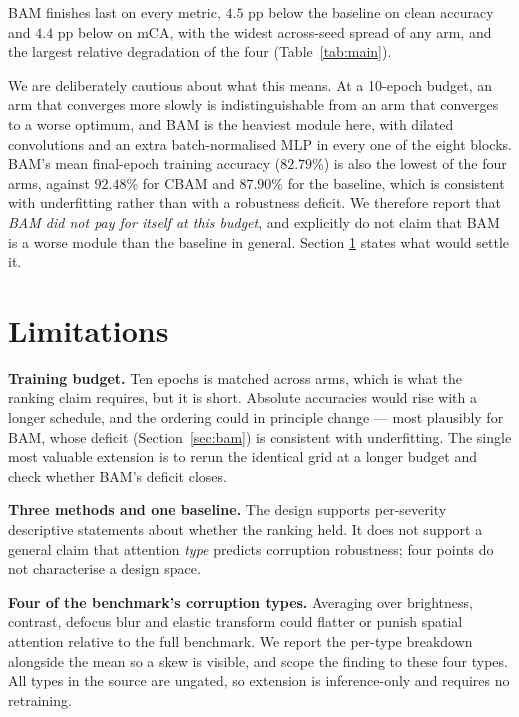 \documentclass[10pt]{article}
\begin{document}
BAM finishes last on every metric, $4.5$ pp below the baseline on clean accuracy
and $4.4$ pp below on mCA, with the widest across-seed spread of any arm, and the largest relative
degradation of the four (Table~\ref{tab:main}).

We are deliberately cautious about what this means. At a 10-epoch budget, an arm
that converges more slowly is indistinguishable from an arm that converges to a
worse optimum, and BAM is the heaviest module here, with dilated convolutions
and an extra batch-normalised MLP in every one of the eight blocks. BAM's mean
final-epoch training accuracy ($82.79$\%) is also the lowest of the four arms,
against $92.48$\% for CBAM and $87.90$\% for the baseline, which is consistent
with underfitting rather than with a robustness deficit. We therefore report
that \emph{BAM did not pay for itself at this budget}, and explicitly do not
claim that BAM is a worse module than the baseline in general. Section
\ref{sec:limitations} states what would settle it.

\section{Limitations}
\label{sec:limitations}

\textbf{Training budget.} Ten epochs is matched across arms, which is what the
ranking claim requires, but it is short. Absolute accuracies would rise with a
longer schedule, and the ordering could in principle change --- most plausibly
for BAM, whose deficit (Section~\ref{sec:bam}) is consistent with underfitting.
The single most valuable extension is to rerun the identical grid at a longer
budget and check whether BAM's deficit closes.

\textbf{Three methods and one baseline.} The design supports per-severity
descriptive statements about whether the ranking held. It does not support a
general claim that attention \emph{type} predicts corruption robustness; four
points do not characterise a design space.

\textbf{Four of the benchmark's corruption types.} Averaging over brightness,
contrast, defocus blur and elastic transform could flatter or punish spatial
attention relative to the full benchmark. We report the per-type breakdown
alongside the mean so a skew is visible, and scope the finding to these four
types. All types in the source are ungated, so extension is inference-only and
requires no retraining.
\end{document}
